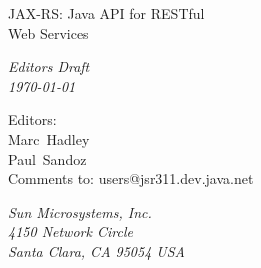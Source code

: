 \begin{titlepage}
\raggedleft

\vspace*{60pt}

{\Huge
\textsf{JAX-RS: Java API for RESTful\\\vspace{10pt}
 Web Services}}

\vspace{20pt}

{
\Large\textit{Editors Draft\\
\today}
}

\vspace{40pt}

{\large Editors:\\
Marc\ Hadley\\
Paul\ Sandoz\\
\vspace{10pt}Comments to: users@jsr311.dev.java.net
}

\vspace{80pt}

{\small\textit{Sun Microsystems, Inc.\\
4150 Network Circle\\
Santa Clara, CA 95054 USA}
}
\end{titlepage} 
